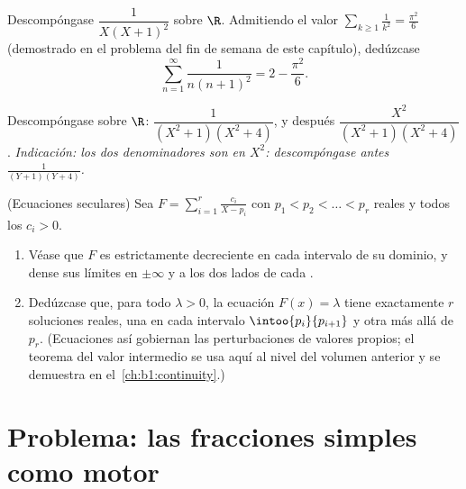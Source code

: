 \begin{exercise}[$\star\star$]\label{exo:b1:fractions:10}
Descompóngase $\dfrac{1}{X(X+1)^2}$ sobre $\R$. Admitiendo el valor
$\sum_{k \geq 1} \frac1{k^2} = \frac{\pi^2}6$ (demostrado en el problema
del fin de semana de este capítulo), dedúzcase
\[
\sum_{n=1}^{\infty} \frac{1}{n(n+1)^2} = 2 - \frac{\pi^2}{6} .
\]
\end{exercise}

\begin{exercise}[$\star\star$]\label{exo:b1:fractions:11}
Descompóngase sobre $\R$: $\dfrac{1}{(X^2+1)(X^2+4)}$, y después
$\dfrac{X^2}{(X^2+1)(X^2+4)}$. \emph{Indicación: los dos denominadores
son  en $X^2$: descompóngase antes $\frac1{(Y+1)(Y+4)}$.}
\end{exercise}

\begin{exercise}[$\star\star\star$]\label{exo:b1:fractions:12}
(Ecuaciones seculares) Sea $F = \sum_{i=1}^{r} \frac{c_i}{X - p_i}$ con
$p_1 < p_2 < \dots < p_r$ reales y todos los $c_i > 0$.
\begin{enumerate}
  \item Véase que $F$ es estrictamente decreciente en cada intervalo
        de su dominio, y dense sus límites en $\pm\infty$ y a los dos
        lados de cada .
  \item Dedúzcase que, para todo $\lambda > 0$, la ecuación
        $F(x) = \lambda$ tiene exactamente $r$ soluciones reales, una
        en cada intervalo $\intoo{p_i}{p_{i+1}}$ y otra más allá de
        $p_r$. (Ecuaciones así gobiernan las perturbaciones de valores
        propios; el teorema del valor intermedio se usa aquí al nivel
        del volumen anterior y se demuestra en el~\cref{ch:b1:continuity}.)
\end{enumerate}
\end{exercise}

\section{Problema: las fracciones simples como motor}

